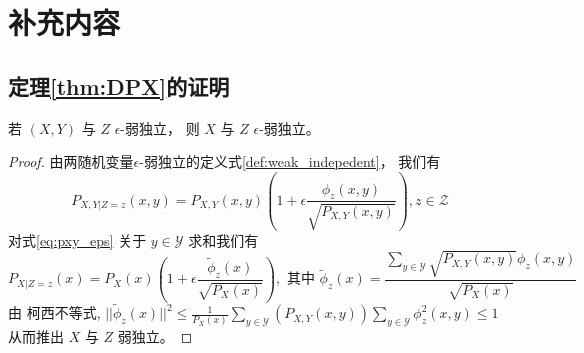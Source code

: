 
\chapter{补充内容}



\section{定理\ref{thm:DPX}的证明}

\begin{lemma}\label{lem:xyz}
	若 $(X,Y)$ 与 $Z$ $\epsilon$-弱独立，
  则 $X$ 与 $Z$ $\epsilon$-弱独立。
\end{lemma}
\begin{proof}
	由两随机变量$\epsilon$-弱独立的定义式\ref{def:weak_indepedent}，
  我们有
	\begin{equation}\label{eq:pxy_eps}
	P_{X,Y|Z=z}(x,y) = P_{X,Y}(x,y)\left(1+\epsilon \frac{\phi_z(x,y)}{\sqrt{P_{X,Y}(x,y)}}
  \right), z \in \mathcal{Z}
	\end{equation}
	对式\ref{eq:pxy_eps} 关于 $y\in \mathcal{Y}$ 求和我们有
	\begin{equation}
	P_{X|Z=z}(x) = P_X(x)\left(1+\epsilon\frac{\tilde{\phi}_z(x)}{\sqrt{P_X(x)}} \right),
	\textrm{ 其中 } \tilde{\phi}_z(x) = \frac{\sum_{y\in \mathcal{Y}} \sqrt{P_{X,Y}(x,y) }\phi_z(x,y)}{\sqrt{P_X(x)}}
	\end{equation}
	由 柯西不等式, $||\tilde{\phi}_z(x)||^2 \leq \frac{1}{P_X(x)}
	\sum_{y\in \mathcal{Y}}(P_{X,Y}(x,y))
	\sum_{y\in \mathcal{Y}} \phi_z^2(x,y) \leq 1
	$
	从而推出 $X$  与 $Z$ 弱独立。
\end{proof}
